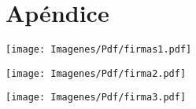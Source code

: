 \documentclass[final, fmstyle, 12pt]{article}
\begin{document}
\newpage 


\newpage 


\newpage 

\newpage 




\section{Apéndice}
\begin{center}
    
\texttt{[image: Imagenes/Pdf/firmas1.pdf]}

\texttt{[image: Imagenes/Pdf/firma2.pdf]}

\texttt{[image: Imagenes/Pdf/firma3.pdf]}

\end{center}
\end{document}
